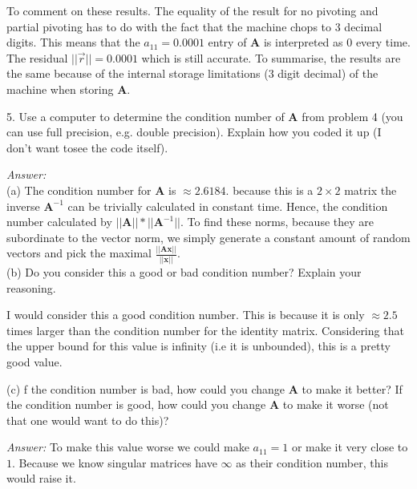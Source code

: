 \documentclass{article}
\begin{document}
    To comment on these results. The equality of the result for no pivoting and
    partial pivoting has to do with the fact that the machine chops to 3 decimal digits.
    This means that the $a_{11} = 0.0001$ entry of $\bm{A}$ is interpreted as $0$
    every time. The residual $||\vec{r}|| = 0.0001$ which is still accurate.
    To summarise, the results are the same because of the internal storage
    limitations (3 digit decimal) of the machine when storing $\bm{A}$.

    \vspace{1cm}
    5. Use a computer to determine the condition number of $\bm{A}$ from problem 4 
    (you can use full precision, e.g. double precision).  Explain how you coded it up 
    (I don’t want tosee the code itself).
    
    \vspace{0.5cm}
    \textit{Answer:} \\
    (a) The condition number for $\bm{A}$ is $\approx 2.6184$.
    because this is a $2\times 2$ matrix the inverse $\bm{A}^{-1}$ can be trivially
    calculated in constant time. Hence, the condition number calculated by
    $||\bm{A}||*||\bm{A}^{-1}||$. To find these norms, because they are subordinate
    to the vector norm, we simply generate a constant amount of random vectors and 
    pick the maximal $\frac{||\bm{A}\bm{x}||}{||\bm{x}||}$. \\
    (b) Do you consider this a good or bad condition number?
    Explain your reasoning.

    \vspace{0.5cm}
    I would consider this a good condition number. This is because it is only $\approx 2.5$
    times larger than the condition number for the identity matrix. Considering that the
    upper bound for this value is infinity (i.e it is unbounded), this is a pretty good value.

    \vspace{1cm}
    (c) f the condition number is bad, how could you change $\bm{A}$ to make it better? If the 
    condition number is good, how could you change $\bm{A}$ to make it worse (not that one 
    would want to do this)?

    \vspace{0.5cm}
    \textit{Answer:} To make this value worse we could make $a_{11} = 1$ or make 
    it very close to $1$. Because we know singular matrices have $\infty$ as their condition
    number, this would raise it. 
\end{document}

